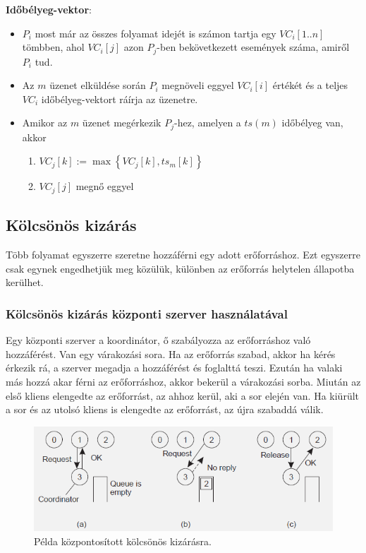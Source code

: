\documentclass[margin=0px]{article}
\begin{document}
	\noindent \textbf{Időbélyeg-vektor}: 
	\begin{itemize}
		\item	$P_{i}$ most már az összes folyamat idejét is számon tartja egy $VC_{i}[1..n]$ tömbben, ahol
		$VC_{i}[j]$ azon $P_{j}$-ben bekövetkezett események száma, amiről $P_{i}$ tud.
		
		\item	Az $m$ üzenet elküldése során $P_{i}$ megnöveli eggyel $VC_{i}[i]$ értékét és a teljes $VC_{i}$
		időbélyeg-vektort ráírja az üzenetre.
		
		\item	Amikor az $m$ üzenet megérkezik $P_{j}$-hez, amelyen a $ts(m)$ időbélyeg van, akkor
		\begin{enumerate}
			\item	$VC_{j}[k] := \max \left\{VC_{j}[k], ts_{m}[k]\right\}$
			\item	$VC_{j}[j]$ megnő eggyel
		\end{enumerate}
	\end{itemize}
	
	\subsection{Kölcsönös kizárás}
	
	Több folyamat egyszerre szeretne hozzáférni egy adott erőforráshoz. Ezt egyszerre csak egynek engedhetjük meg
	közülük, különben az erőforrás helytelen állapotba kerülhet.
	
	\subsubsection{Kölcsönös kizárás központi szerver használatával}
	
	Egy központi szerver a koordinátor, ő szabályozza az erőforráshoz való hozzáférést. Van egy várakozási sora.
	Ha az erőforrás szabad, akkor ha kérés érkezik rá, a szerver megadja a hozzáférést és foglalttá teszi. Ezután
	ha valaki más hozzá akar férni az erőforráshoz, akkor bekerül a várakozási sorba. Miután az első kliens
	elengedte az erőforrást, az ahhoz kerül, aki a sor elején van. Ha kiürült a sor és az utolsó kliens is
	elengedte az erőforrást, az újra szabaddá válik.
	
	\begin{figure}[H]
		\centering
		\includegraphics[width=0.6\linewidth]{img/kolcskizar_kozp}
		\caption{Példa központosított kölcsönös kizárásra.}
		\label{fig:kolcskizar_kozp}
	\end{figure}
	
\end{document}
